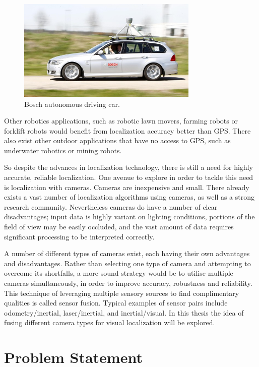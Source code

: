 \begin{figure}[h]
  \centering
    \includegraphics[width=0.77\textwidth]{chapters/images/bosch_car}
  \caption{Bosch autonomous driving car.}
  \label{fig:bosch_car}
\end{figure}

Other robotics applications, such as robotic lawn movers, farming robots or forklift robots would benefit from localization accuracy better than GPS.  There also exist other outdoor applications that have no access to GPS, such as underwater robotics or mining robots.

So despite the advances in localization technology, there is still a need for highly accurate, reliable localization.  One avenue to explore in order to tackle this need is localization with cameras.  Cameras are inexpensive and small.  There already exists a vast number of localization algorithms using cameras, as well as a strong research community.  Nevertheless cameras do have a number of clear disadvantages; input data is highly variant on lighting conditions, portions of the field of view may be easily occluded, and the vast amount of data requires significant processing to be interpreted correctly.

A number of different types of cameras exist, each having their own advantages and disadvantages.  Rather than selecting one type of camera and attempting to overcome its shortfalls, a more sound strategy would be to utilise multiple cameras simultaneously, in order to improve accuracy, robustness and reliability.  This technique of leveraging multiple sensory sources to find complimentary qualities is called sensor fusion.  Typical examples of sensor pairs include odometry/inertial, laser/inertial, and inertial/visual.  In this thesis the idea of fusing different camera types for visual localization will be explored.

\section{Problem Statement}


